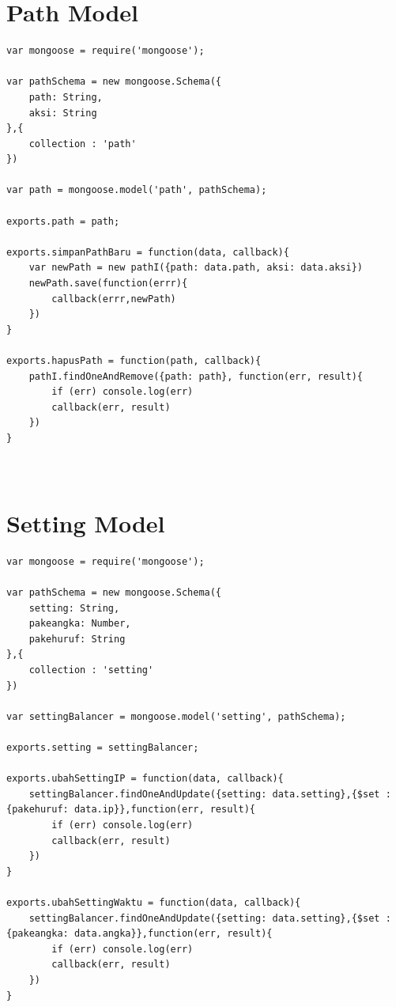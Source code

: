\documentclass{ta-its}
\begin{document}
		\section{Path Model}
			\begin{lstlisting}[frame=single,tabsize=2,breaklines,caption={Path Model untuk Koleksi URL},label=pathModel]	
var mongoose = require('mongoose');

var pathSchema = new mongoose.Schema({
	path: String,
	aksi: String
},{
	collection : 'path'
})

var path = mongoose.model('path', pathSchema);

exports.path = path;

exports.simpanPathBaru = function(data, callback){
	var newPath = new pathI({path: data.path, aksi: data.aksi})
	newPath.save(function(errr){
		callback(errr,newPath)
	})
}

exports.hapusPath = function(path, callback){
	pathI.findOneAndRemove({path: path}, function(err, result){
		if (err) console.log(err)
		callback(err, result)
	})
}

			
			\end{lstlisting}
		
		\section{Setting Model}
			\begin{lstlisting}[frame=single,tabsize=2,breaklines,caption={Setting Model untuk Koleksi Setting},label=settingModel]	
var mongoose = require('mongoose');

var pathSchema = new mongoose.Schema({
	setting: String,
	pakeangka: Number,
	pakehuruf: String
},{
	collection : 'setting'
})

var settingBalancer = mongoose.model('setting', pathSchema);

exports.setting = settingBalancer;

exports.ubahSettingIP = function(data, callback){
	settingBalancer.findOneAndUpdate({setting: data.setting},{$set : {pakehuruf: data.ip}},function(err, result){
		if (err) console.log(err)
		callback(err, result)
	})
}

exports.ubahSettingWaktu = function(data, callback){
	settingBalancer.findOneAndUpdate({setting: data.setting},{$set : {pakeangka: data.angka}},function(err, result){
		if (err) console.log(err)
		callback(err, result)
	})
}
			
			\end{lstlisting}
		
\end{document}
